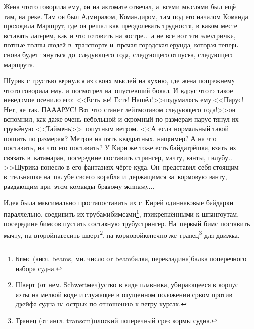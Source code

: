 {Жена что\sdash то говорила ему, он на автомате отвечал, а~всеми мыслями был ещё там, на реке. Там он был Адмиралом, Командиром, там под его началом Команда проходила Маршрут, где он решал как преодолевать трудности, в каком месте вставать лагерем, как и что готовить на костре$\ldots$ а не все вот эти электрички, потные толпы людей в~транспорте и~прочая городская ерунда, которая теперь снова будет тянуться до~следующего года, следующего отпуска, следующего маршрута.

Шурик с грустью вернулся из своих мыслей на кухню, где жена по\sdash прежнему что\sdash то говорила ему, и посмотрел на~опустевший бокал. И вдруг что\sdash то такое неведомое осенило его: <<Есть же! Есть! Нашёл!>>\mdash подумалось ему,\mdash <<Парус! Нет, не так. ПА\sdash А\sdash АРУС! Вот что станет лейтмотивом следующего года!>>\mdash он вспомнил, как даже очень небольшой и скромный по размерам парус тянул их гружёную <<Таймень>> попутным ветром. <<А если нормальный такой пошить по размерам? Метров на пять квадратных, например? А на что поставить, на что его поставить? У Кири же тоже есть байда\sdash трёшка, взять их связать в~катамаран, посередине поставить стрингер, мачту, ванты, палубу$\ldots$>>\mdash Шурика понесло в его фантазиях чёрте куда. Он~представил себя стоящим в~тельняшке на~палубе своего корабля и~держащимся за~кормовую ванту, раздающим при~этом команды бравому экипажу$\ldots$

\renewcommand*{\thefootnote}{\arabic{footnote}}
\setcounter{footnote}{0}

Идея была максимально проста\mdash поставить их с~Кирей одиннаковые  байдарки параллельно, соединить их трубами\sdash бимсами\footnote{Бимс (англ. beams, мн. число от beam\mdash балка, перекладина)\mdash балка поперечного набора судна.}, прикреплёнными к шпангоутам, посередине бимсов пустить составную трубу\sdash стрингер. На~первый бимс поставить мачту, на второй\mdash навесить шверт\footnote{Шверт (от нем. Schwert\mdash меч)\mdash уст\sdash во в виде плавника, убирающееся в корпус яхты на мелкой воде и служащее в опущенном положении ср\sdash вом против дрейфа судна на острых по отношению к ветру курсах.}, на кормовой\mdash конечно же транец\footnote{Транец (от англ. transom)\mdash плоский поперечный срез кормы судна.} для движка.

\renewcommand*{\thefootnote}{\arabic{footnote}}
\setcounter{footnote}{0}

}
